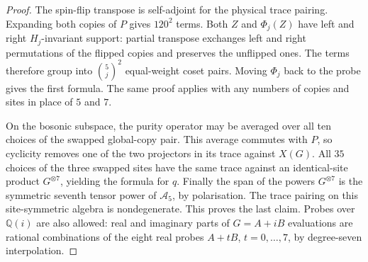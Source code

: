 \begin{proof}
The spin-flip transpose is self-adjoint for the physical trace pairing.
Expanding both copies of $P$ gives $120^2$ terms. Both $Z$ and $\Phi_j(Z)$
have left and right $H_j$-invariant support: partial transpose exchanges
left and right permutations of the flipped copies and preserves the
unflipped ones. The terms therefore group into $\binom5j^2$ equal-weight
coset pairs. Moving $\Phi_j$ back to the probe gives the first formula.
The same proof applies with any numbers of copies and sites in place of $5$ and $7$.

On the bosonic subspace, the purity operator may be averaged over all
ten choices of the swapped global-copy pair. This average commutes with
$P$, so cyclicity removes one of the two projectors in its trace against
$X(G)$. All $35$ choices of the three swapped sites have the same trace
against an identical-site product $G^{\otimes7}$, yielding the formula
for $q$. Finally the span of the powers $G^{\otimes7}$ is the symmetric
seventh tensor power of $\mathcal A_5$, by polarisation. The trace pairing
on this site-symmetric algebra is nondegenerate. This proves the last claim.
Probes over $\mathbb Q(i)$ are also allowed: real and imaginary parts of
$G=A+iB$ evaluations are rational combinations of the eight real probes
$A+tB$, $t=0,\ldots,7$, by degree-seven interpolation.
\end{proof}

